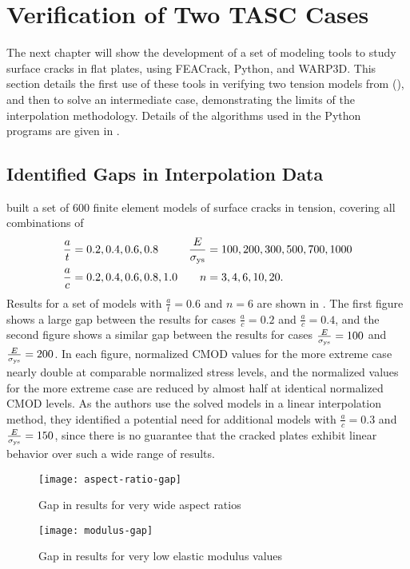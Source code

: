 \FloatBarrier

\section{Verification of Two TASC Cases}
\label{sec:verification-tasc}

The next chapter will show the development of a set of modeling tools to study surface cracks in flat plates, using FEACrack, Python, and WARP3D.
This section details the first use of these tools in verifying two tension models from \citeauthor{allenwells2014} (\citeyear{allenwells2014}), and then to solve an intermediate case, demonstrating the limits of the interpolation methodology.
Details of the algorithms used in the Python programs are given in .

\subsection{Identified Gaps in Interpolation Data}

\citeauthor{allenwells2014} built a set of 600 finite element models of surface cracks in tension, covering all combinations of
\begin{align*}
\frac{a}{t} &= 0.2, 0.4, 0.6, 0.8 & \frac{E}{\sigma_{\textnormal{ys}}} &= 100, 200, 300, 500, 700, 1000 \\
\frac{a}{c} &= 0.2, 0.4, 0.6, 0.8, 1.0 & n &= 3, 4, 6, 10, 20.
\end{align*}
Results for a set of models with \(\frac{a}{t}=0.6\) and \(n=6\) are shown in .
The first figure shows a large gap between the results for cases \(\frac{a}{c}=0.2\) and \(\frac{a}{c}=0.4\), and the second figure shows a similar gap between the results for cases \(\frac{E}{\sigma_{\textnormal{ys}}}=100\) and \(\frac{E}{\sigma_{\textnormal{ys}}}=200\).
In each figure, normalized CMOD values for the more extreme case nearly double at comparable normalized stress levels, and the normalized \J values for the more extreme case are reduced by almost half at identical normalized CMOD levels.
As the authors use the solved models in a linear interpolation method, they identified a potential need for additional models with \(\frac{a}{c}=0.3\) and \(\frac{E}{\sigma_{\textnormal{ys}}}=150\), since there is no guarantee that the cracked plates exhibit linear behavior over such a wide range of results.
\begin{figure}[tbp]
\centering
\texttt{[image: aspect-ratio-gap]}
\caption[Gap in results for very wide aspect ratios]{\label{fig:aspect-ratio-gap} Gap in results for very wide aspect ratios \citep{allenwells2014}}
\end{figure}
\begin{figure}[tbp]
\centering
\texttt{[image: modulus-gap]}
\caption[Gap in results for very low elastic modulus values]{\label{fig:modulus-gap} Gap in results for very low elastic modulus values \citep{allenwells2014}}
\end{figure}


